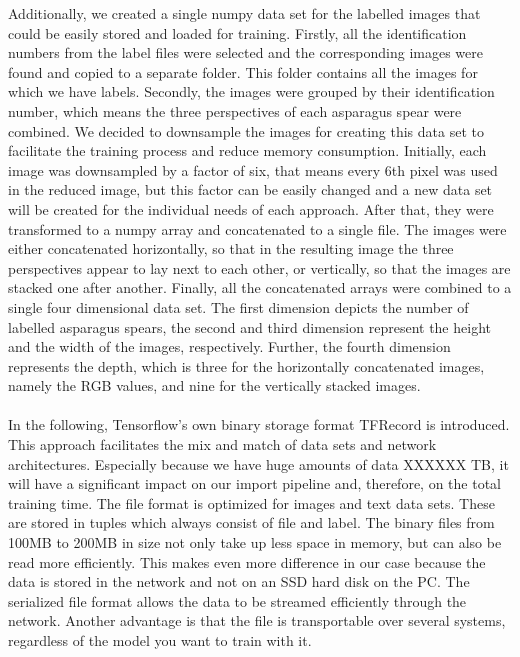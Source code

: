 {Additionally, we created a single numpy data set for the labelled images that could be easily stored and loaded for training. Firstly, all the identification numbers from the label files were selected and the corresponding images were found and copied to a separate folder. This folder contains all the images for which we have labels. Secondly, the images were grouped by their identification number, which means the three perspectives of each asparagus spear were combined. We decided to downsample the images for creating this data set to facilitate the training process and reduce memory consumption. Initially, each image was downsampled by a factor of six, that means every 6th pixel was used in the reduced image, but this factor can be easily changed and a new data set will be created for the individual needs of each approach. After that, they were transformed to a numpy array and concatenated to a single file. The images were either concatenated horizontally, so that in the resulting image the three perspectives appear to lay next to each other, or vertically, so that the images are stacked one after another. Finally, all the concatenated arrays were combined to a single four dimensional data set. The first dimension depicts the number of labelled asparagus spears, the second and third dimension represent the height and the width of the images, respectively.  Further, the fourth dimension represents the depth, which is three for the horizontally concatenated images, namely the RGB values, and nine for the vertically stacked images. \\
\\
In the following, Tensorflow's own binary storage format TFRecord is introduced. This approach facilitates the mix and match of data sets and network architectures. Especially because we have huge amounts of data XXXXXX TB, it will have a significant impact on our import pipeline and, therefore, on the total training time. The file format is optimized for images and text data sets. These are stored in tuples which always consist of file and label. The binary files from 100MB to 200MB in size not only take up less space in memory, but can also be read more efficiently. This makes even more difference in our case because the data is stored in the network and not on an SSD hard disk on the PC. The serialized file format allows the data to be streamed efficiently through the network. Another advantage is that the file is transportable over several systems, regardless of the model you want to train with it. \\
}

